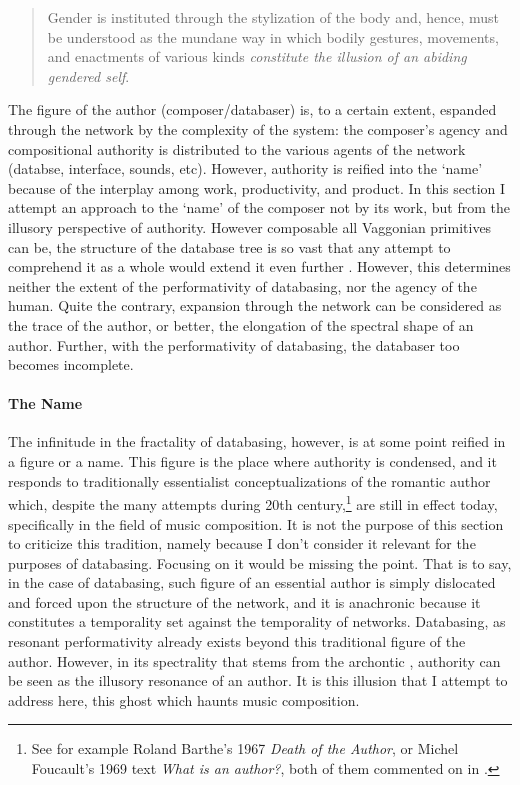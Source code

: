 \begin{quote}
	Gender is instituted through the stylization of the body and, hence, must be understood as the mundane way in which bodily gestures, movements, and enactments of various kinds \textit{constitute the illusion of an abiding gendered self}. \im \parencite[519]{But88:Per}
\end{quote}

The figure of the author (composer/databaser) is, to a certain extent, espanded through the network by the complexity of the system: the composer's agency and compositional authority is distributed to the various agents of the network (databse, interface, sounds, etc). However, authority is reified into the `name' because of the interplay among work, productivity, and product. In this section I attempt an approach to the `name' of the composer not by its work, but from the illusory perspective of authority. However composable all Vaggonian primitives can be, the structure of the database tree is so vast that any attempt to comprehend it as a whole would extend it even further . However, this determines neither the extent of the performativity of databasing, nor the agency of the human. Quite the contrary, expansion through the network can be considered as the trace of the author, or better, the elongation of the spectral shape of an author. Further, with the performativity of databasing, the databaser too becomes incomplete.

\paragraph{The Name}
The infinitude in the fractality of databasing, however, is at some point reified in a figure or a name. This figure is the place where authority is condensed, and it responds to traditionally essentialist conceptualizations of the romantic author which, despite the many attempts during 20th century,\footnote{See for example Roland Barthe's 1967 \textit{Death of the Author}, or Michel Foucault's 1969 text \textit{What is an author?}, both of them commented on in \parencite{Dan07:The}.} are still in effect today, specifically in the field of music composition. It is not the purpose of this section to criticize this tradition, namely because I don't consider it relevant for the purposes of databasing. Focusing on it would be missing the point. That is to say, in the case of databasing, such figure of an essential author is simply dislocated and forced upon the structure of the network, and it is anachronic because it constitutes a temporality set against the temporality of networks. Databasing, as resonant performativity already exists beyond this traditional figure of the author. However, in its spectrality that stems from the archontic , authority can be seen as the illusory resonance of an author. It is this illusion that I attempt to address here, this ghost which haunts music composition.

